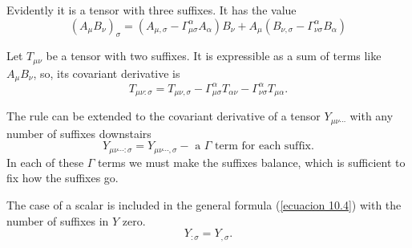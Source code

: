Evidently it is a tensor with three suffixes. It has the value
\[
  \left(A_{\mu} B_{\nu} \right)_{\sigma} =
  \left(A_{\mu,\sigma} - \Gamma^{\alpha}_{\mu\sigma} A_{\alpha}\right)B_{\nu} 
+ A_{\mu} \left(B_{\nu,\sigma} - \Gamma^{\alpha}_{\nu\sigma}B_{\alpha}\right)
\]

Let $T_{\mu\nu}$ be a tensor with two suffixes. It is expressible as a sum of 
terms like $A_{\mu}B_{\nu}$, so, its covariant derivative is
\begin{equation}
 \label{ecuacion 10.3}
 T_{\mu\nu:\sigma} = T_{\mu\nu,\sigma}
 - \Gamma^{\alpha}_{\mu\sigma} T_{\alpha\nu}
 - \Gamma^{\alpha}_{\nu\sigma} T_{\mu\alpha}.
\end{equation}


The rule can be extended to the covariant derivative of a tensor 
$Y_{\mu\nu\cdots}$ with any number of suffixes downstairs
\begin{equation}
 \label{ecuacion 10.4}
 Y_{\mu\nu\cdots:\sigma} = Y_{\mu\nu\cdots,\sigma} - \mbox{ a }
 \Gamma \mbox{ term for each suffix}.
\end{equation}
In each of these $\Gamma$ terms we must make the suffixes balance, which is 
sufficient to fix how the suffixes go.

The case of a scalar is included in the general formula (\ref{ecuacion 10.4}) 
with the number of suffixes in $Y$ zero.
\begin{equation}
 \label{ecuacion 10.5}
 Y_{:\sigma} = Y_{,\sigma} .
\end{equation}



